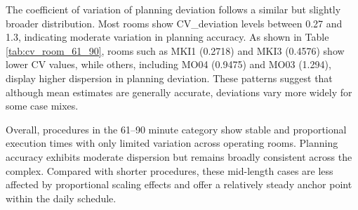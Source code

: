 \documentclass[
]{article}
\begin{document}
The coefficient of variation of planning deviation follows a similar but
slightly broader distribution. Most rooms show CV\_deviation levels
between 0.27 and 1.3, indicating moderate variation in planning
accuracy. As shown in Table \ref{tab:cv_room_61_90}, rooms such as MKI1
(0.2718) and MKI3 (0.4576) show lower CV values, while others, including
MO04 (0.9475) and MO03 (1.294), display higher dispersion in planning
deviation. These patterns suggest that although mean estimates are
generally accurate, deviations vary more widely for some case mixes.

Overall, procedures in the 61--90 minute category show stable and
proportional execution times with only limited variation across
operating rooms. Planning accuracy exhibits moderate dispersion but
remains broadly consistent across the complex. Compared with shorter
procedures, these mid-length cases are less affected by proportional
scaling effects and offer a relatively steady anchor point within the
daily schedule.
\end{document}
